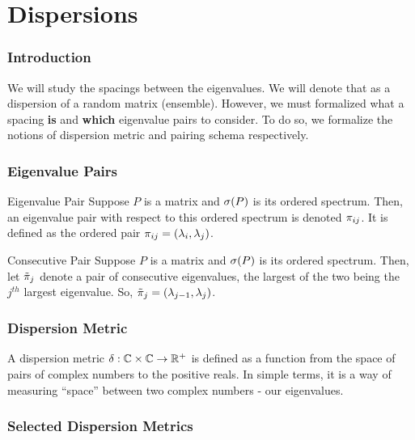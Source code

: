 

\section{Dispersions}
\begin{frame} \frametitle{Introduction}

We will study the spacings between the eigenvalues. We will denote that as a dispersion of a random matrix (ensemble).
However, we must formalized what a spacing \textbf{is} and \textbf{which} eigenvalue pairs to consider.
To do so, we formalize the notions of dispersion metric and pairing schema respectively.

\end{frame}
\begin{frame} \frametitle{Eigenvalue Pairs}

\begin{alertblock}{Eigenvalue Pair}
  Suppose $P$ is a matrix and $\sigma(P)$ is its ordered spectrum. Then, an eigenvalue pair with respect to this ordered spectrum is denoted ${\pi_{ij}}$.
  It is defined as the ordered pair ${\pi_{ij}} = (\lambda_i, \lambda_j)$.
\end{alertblock}

\begin{alertblock}{Consecutive Pair}
  Suppose $P$ is a matrix and $\sigma(P)$ is its ordered spectrum. Then, let ${\tilde{\pi}}_j$ denote a pair of consecutive eigenvalues, the largest of the two being the $j^{th}$ largest eigenvalue.
  So, ${\tilde{\pi}}_j = (\lambda_{j-1},\lambda_{j})$.
\end{alertblock}

\end{frame}
\begin{frame} \frametitle{Dispersion Metric}

\begin{alertblock}{}
A dispersion metric $\delta: \mathbb{C} \times \mathbb{C} \to \mathbb{R}^+$ is defined as a function from the space of pairs of complex numbers to the positive reals.
In simple terms, it is a way of measuring ``space'' between two complex numbers - our eigenvalues.
\end{alertblock}

\end{frame}
\begin{frame} \frametitle{Selected Dispersion Metrics}

\dispersiontable

\end{frame}

